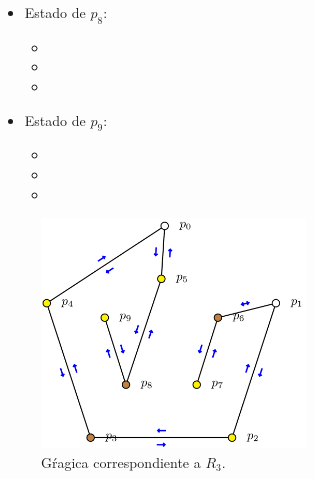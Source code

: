 \begin{multicols}{2}
\begin{itemize}
\begin{itemize}
      \item {}
      \end{itemize}

\item Estado de $p_8$:
      \begin{itemize}
      \item {}
      
      \item {}
      
      \item {}
      \end{itemize}

\item Estado de $p_9$:
      \begin{itemize}
      \item {}
      
      \item {}
      
      \item {}
      \end{itemize}

\end{itemize}
\end{multicols} 

\begin{figure}[ht]
        \begin{center}
                \includegraphics[width=7cm]{R3.png}
                \caption{Gŕagica correspondiente a $R_3$.}
        \end{center}
\end{figure}

